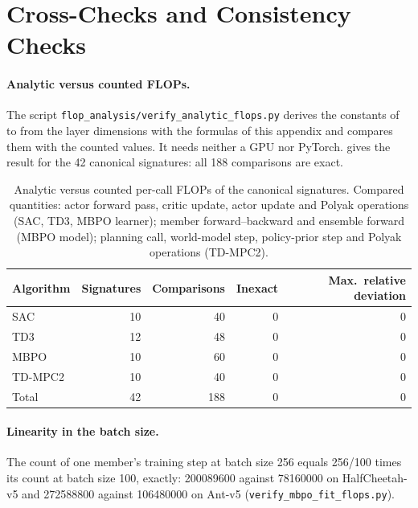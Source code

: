\section{Cross-Checks and Consistency Checks}\label{sec:app-flop-checks}

\paragraph{Analytic versus counted FLOPs.} The script \texttt{flop\_\allowbreak analysis/\allowbreak verify\_\allowbreak analytic\_\allowbreak flops.py} derives the constants of  to  from the layer dimensions with the formulas of this appendix and compares them with the counted values.
It needs neither a GPU nor PyTorch.
 gives the result for the \num{42} canonical signatures: all \num{188} comparisons are exact.

\begin{table}[tbp]
  \centering
  \footnotesize
  \caption{Analytic versus counted per-call FLOPs of the canonical signatures.
    Compared quantities: actor forward pass, critic update, actor update and Polyak operations (SAC, TD3, MBPO learner); member forward--backward and ensemble forward (MBPO model); planning call, world-model step, policy-prior step and Polyak operations (TD-MPC2).}
  \label{tab:app-flop-crosscheck}
  \begin{tabular}{@{}lrrrr@{}}
    \toprule
    Algorithm & Signatures & Comparisons & Inexact & Max.\ relative deviation \\
    \midrule
    SAC & \num{10} & \num{40} & \num{0} & 0 \\
    TD3 & \num{12} & \num{48} & \num{0} & 0 \\
    MBPO & \num{10} & \num{60} & \num{0} & 0 \\
    TD-MPC2 & \num{10} & \num{40} & \num{0} & 0 \\
    \midrule
    Total & \num{42} & \num{188} & \num{0} & 0 \\
    \bottomrule
  \end{tabular}
\end{table}

\paragraph{Linearity in the batch size.} The count of one member's training step at batch size \num{256} equals \num{256}/\num{100} times its count at batch size \num{100}, exactly: \num{200089600} against \num{78160000} on HalfCheetah-v5 and \num{272588800} against \num{106480000} on Ant-v5 (\texttt{verify\_\allowbreak mbpo\_\allowbreak fit\_\allowbreak flops.py}).

